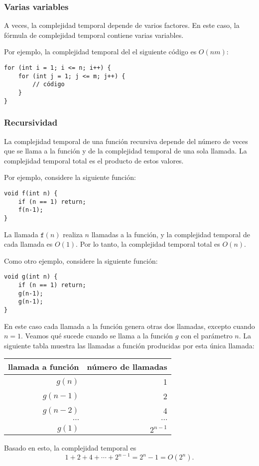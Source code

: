 \subsubsection*{Varias variables}

A veces, la complejidad temporal depende de
varios factores.
En este caso, la fórmula de complejidad temporal
contiene varias variables.

Por ejemplo, la complejidad temporal del
el siguiente código es $O(nm)$:

\begin{lstlisting}
for (int i = 1; i <= n; i++) {
    for (int j = 1; j <= m; j++) {
        // código
    }
}
\end{lstlisting}

\subsubsection*{Recursividad}

La complejidad temporal de una función recursiva
depende del número de veces que se llama a la función
y de la complejidad temporal de una sola llamada.
La complejidad temporal total es el producto de
estos valores.

Por ejemplo, considere la siguiente función:
\begin{lstlisting}
void f(int n) {
    if (n == 1) return;
    f(n-1);
}
\end{lstlisting}
La llamada $\texttt{f}(n)$ realiza $n$ llamadas a la función,
y la complejidad temporal de cada llamada es $O(1)$.
Por lo tanto, la complejidad temporal total es $O(n)$.

Como otro ejemplo, considere la siguiente función:
\begin{lstlisting}
void g(int n) {
    if (n == 1) return;
    g(n-1);
    g(n-1);
}
\end{lstlisting}
En este caso cada llamada a la función genera otras dos
llamadas, excepto cuando $n=1$.
Veamos qué sucede cuando se llama a la función $g$
con el parámetro $n$.
La siguiente tabla muestra las llamadas a función
producidas por esta única llamada:
\begin{center}
\begin{tabular}{rr}
llamada a función & número de llamadas \\
\hline
$g(n)$ & 1 \\
$g(n-1)$ & 2 \\
$g(n-2)$ & 4 \\
$\cdots$ & $\cdots$ \\
$g(1)$ & $2^{n-1}$ \\
\end{tabular}
\end{center}
Basado en esto, la complejidad temporal es
\[1+2+4+\cdots+2^{n-1} = 2^n-1 = O(2^n).\]

